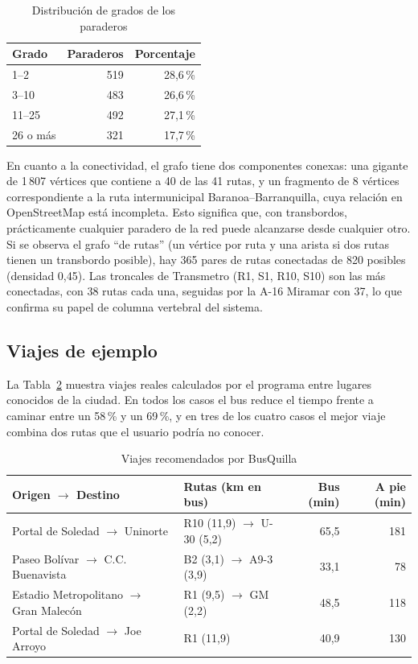 \documentclass[12pt,letterpaper]{article}
\begin{document}
\begin{table}[H]
\centering
\caption{Distribución de grados de los paraderos}\label{tab:grados}
\begin{tabular}{lrr}
\toprule
Grado & Paraderos & Porcentaje \\
\midrule
1--2 & 519 & 28,6\,\% \\
3--10 & 483 & 26,6\,\% \\
11--25 & 492 & 27,1\,\% \\
26 o más & 321 & 17,7\,\% \\
\bottomrule
\end{tabular}
\end{table}

En cuanto a la conectividad, el grafo tiene dos componentes conexas: una gigante de 1\,807 vértices que contiene a 40 de las 41 rutas, y un fragmento de 8 vértices correspondiente a la ruta intermunicipal Baranoa--Barranquilla, cuya relación en OpenStreetMap está incompleta. Esto significa que, con transbordos, prácticamente cualquier paradero de la red puede alcanzarse desde cualquier otro. Si se observa el grafo ``de rutas'' (un vértice por ruta y una arista si dos rutas tienen un transbordo posible), hay 365 pares de rutas conectadas de 820 posibles (densidad 0,45). Las troncales de Transmetro (R1, S1, R10, S10) son las más conectadas, con 38 rutas cada una, seguidas por la A-16 Miramar con 37, lo que confirma su papel de columna vertebral del sistema.

\subsection{Viajes de ejemplo}
La Tabla~\ref{tab:viajes} muestra viajes reales calculados por el programa entre lugares conocidos de la ciudad. En todos los casos el bus reduce el tiempo frente a caminar entre un 58\,\% y un 69\,\%, y en tres de los cuatro casos el mejor viaje combina dos rutas que el usuario podría no conocer.

\begin{table}[H]
\centering
\caption{Viajes recomendados por BusQuilla}\label{tab:viajes}
\begin{tabular}{llrr}
\toprule
Origen $\to$ Destino & Rutas (km en bus) & Bus (min) & A pie (min) \\
\midrule
Portal de Soledad $\to$ Uninorte & R10 (11,9) $\to$ U-30 (5,2) & 65,5 & 181 \\
Paseo Bolívar $\to$ C.C. Buenavista & B2 (3,1) $\to$ A9-3 (3,9) & 33,1 & 78 \\
Estadio Metropolitano $\to$ Gran Malecón & R1 (9,5) $\to$ GM (2,2) & 48,5 & 118 \\
Portal de Soledad $\to$ Joe Arroyo & R1 (11,9) & 40,9 & 130 \\
\bottomrule
\end{tabular}
\end{table}
\end{document}

